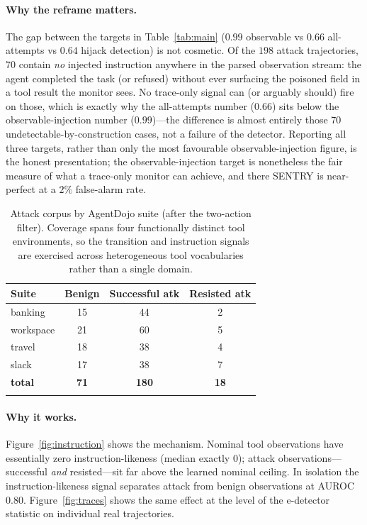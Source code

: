 \documentclass[pdflatex,sn-mathphys-num]{sn-jnl}%
\theoremstyle{thmstyleone}%
\theoremstyle{thmstyletwo}%
\theoremstyle{thmstylethree}%
\begin{document}
\paragraph{Why the reframe matters.}\label{sec:reframe} The gap between the
targets in Table~\ref{tab:main} (\(0.99\) observable vs \(0.66\) all-attempts
vs \(0.64\) hijack detection) is not cosmetic. Of the \(198\) attack
trajectories, \(70\) contain \emph{no} injected instruction anywhere in the
parsed observation stream: the agent completed the task (or refused) without
ever surfacing the poisoned field in a tool result the monitor sees. No
trace-only signal can (or arguably should) fire on those, which is exactly why
the all-attempts number (\(0.66\)) sits below the observable-injection number
(\(0.99\))---the difference is almost entirely those \(70\)
undetectable-by-construction cases, not a failure of the detector. Reporting
all three targets, rather than only the most favourable observable-injection
figure, is the honest presentation; the observable-injection target is
nonetheless the fair measure of what a trace-only monitor can achieve, and
there SENTRY is near-perfect at a \(2\%\) false-alarm rate.

\begin{table}[t]
\centering
\caption{Attack corpus by AgentDojo suite (after the two-action filter).
Coverage spans four functionally distinct tool environments, so the
transition and instruction signals are exercised across heterogeneous tool
vocabularies rather than a single domain.}\label{tab:persuite}
\begin{tabular}{@{}lccc@{}}
\toprule
Suite & Benign & Successful atk & Resisted atk \\
\midrule
banking   & 15 & 44 & 2 \\
workspace & 21 & 60 & 5 \\
travel    & 18 & 38 & 4 \\
slack     & 17 & 38 & 7 \\
\midrule
\textbf{total} & \textbf{71} & \textbf{180} & \textbf{18} \\
\botrule
\end{tabular}
\end{table}

\paragraph{Why it works.}
Figure~\ref{fig:instruction} shows the mechanism. Nominal tool observations
have essentially zero instruction-likeness (median exactly \(0\)); attack
observations---successful \emph{and} resisted---sit far above the learned
nominal ceiling. In isolation the instruction-likeness signal separates attack
from benign observations at AUROC \(0.80\). Figure~\ref{fig:traces} shows the
same effect at the level of the e-detector statistic on individual real
trajectories.
\end{document}

